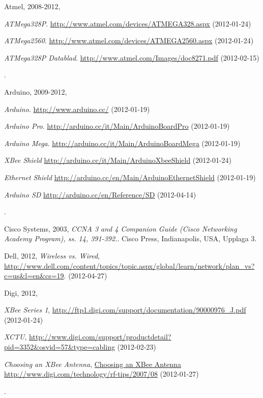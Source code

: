 \documentclass[a4paper,11pt]{article}
\newcounter{qcounter}
\begin{document}
\clearpage
{}
{}

\begin{thebibliography}{9}

\label{atmel}
   Atmel, 2008-2012,\\
   \begin{list}{[]}{}
   \item \emph{ATMega328P}.
   \url{http://www.atmel.com/devices/ATMEGA328.aspx} (2012-01-24)
   \item \emph{ATMega2560}.
   \url{http://www.atmel.com/devices/ATMEGA2560.aspx} (2012-01-24)
   \item \emph{ATMega328P Datablad}.
   \url{http://www.atmel.com/Images/doc8271.pdf} (2012-02-15)
   \end{list}.

\label{arduino}
   Arduino, 2009-2012,\\
   \begin{list}{[]}{}
   \item{\emph{Arduino}. \url{http://www.arduino.cc/} (2012-01-19)}
   \item{\emph{Arduino Pro}. \url{http://arduino.cc/it/Main/ArduinoBoardPro} (2012-01-19)}
   \item{\emph{Arduino Mega}. \url{http://arduino.cc/it/Main/ArduinoBoardMega} (2012-01-19)}
   \item{\emph{XBee Shield} \url{http://arduino.cc/it/Main/ArduinoXbeeShield} (2012-01-24)}
   \item{\emph{Ethernet Shield} \url{http://arduino.cc/en/Main/ArduinoEthernetShield} (2012-01-19)}
   \item{\emph{Arduino SD} \url{http://arduino.cc/en/Reference/SD} (2012-04-14)}
   \end{list}.

\label{cisco}
    Cisco Systems, 2003,
    \emph{CCNA 3 and 4 Companion Guide (Cisco Networking Academy Program), ss. 14, 391-392.}.
    Cisco Press, Indianapolis, USA,
    Upplaga 3.

\label{dell}
    Dell, 2012,
    \emph{Wireless vs. Wired},
    \url{http://www.dell.com/content/topics/topic.aspx/global/learn/network/plan_vs?c=us&l=en&cs=19}. (2012-04-27)

\label{digi}
    Digi, 2012,\\
    \begin{list}{[]}{}
    \item\emph{XBee Series 1},
    \url{http://ftp1.digi.com/support/documentation/90000976_J.pdf} (2012-01-24)
    \item \emph{XCTU},
    \url{http://www.digi.com/support/productdetail?pid=3352&osvid=57&type=cabling} (2012-02-23)
    \item \emph{Choosing an XBee Antenna},
    \url{Choosing an XBee Antenna http://www.digi.com/technology/rf-tips/2007/08} (2012-01-27)
    \end{list}.


\end{thebibliography}
\end{document}
